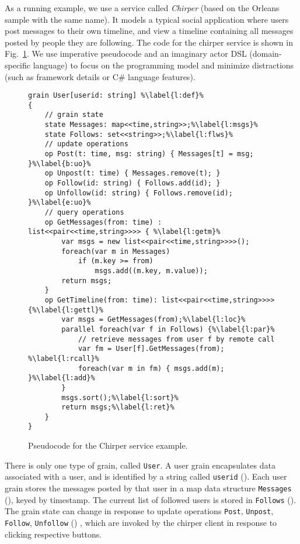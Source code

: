 As a running example, we use a service called \emph{Chirper} (based on the Orleans sample with the same name). It models a typical social application where users post messages to their own timeline, and view a timeline containing all messages posted by people they are following.
The code for the chirper service is shown in Fig.~\ref{fig:chirper}. We use imperative pseudocode and an imaginary actor DSL (domain-specific language) to focus on the programming model and minimize distractions (such as framework details or C\# language features). 

\begin{figure}
\begin{lstlisting}
grain User[userid: string] %\label{l:def}%
{
	// grain state
	state Messages: map<<time,string>>;%\label{l:msgs}%
	state Follows: set<<string>>;%\label{l:flws}%
	// update operations
	op Post(t: time, msg: string) { Messages[t] = msg; }%\label{b:uo}%
	op Unpost(t: time) { Messages.remove(t); }
	op Follow(id: string) { Follows.add(id); }
	op Unfollow(id: string) { Follows.remove(id); }%\label{e:uo}%
	// query operations
	op GetMessages(from: time) : list<<pair<<time,string>>>> { %\label{l:getm}%
		var msgs = new list<<pair<<time,string>>>>();
		foreach(var m in Messages)
			if (m.key >= from)
				msgs.add((m.key, m.value));
		return msgs;
	}
	op GetTimeline(from: time): list<<pair<<time,string>>>> {%\label{l:gettl}%
		var msgs = GetMessages(from);%\label{l:loc}%
		parallel foreach(var f in Follows) {%\label{l:par}%
			// retrieve messages from user f by remote call
			var fm = User[f].GetMessages(from); %\label{l:rcall}%
			foreach(var m in fm) { msgs.add(m); }%\label{l:add}%
		}
		msgs.sort();%\label{l:sort}%
		return msgs;%\label{l:ret}%
	}
}
\end{lstlisting}
\caption{Pseudocode for the Chirper service example.}\label{fig:chirper}
\end{figure}

There is only one type of grain, called \lstinline|User|.  A user grain encapsulates data associated with a user, and is identified by a string called \lstinline{userid} (). Each user grain stores the messages posted by that user in a map data structure \lstinline|Messages| (), keyed by timestamp. The current list of followed users is stored in \lstinline|Follows| (). The grain state can change in response to update operations \lstinline|Post|, \lstinline|Unpost|, \lstinline|Follow|, \lstinline|Unfollow| () , which are invoked by the chirper client in response to clicking respective buttons.

